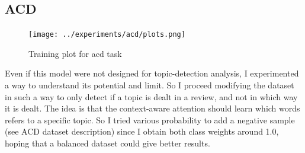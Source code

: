 \documentclass{article}
\begin{document}
        \subsection{ACD}\label{subsec:s2}
            \begin{figure}
                \texttt{[image: ../experiments/acd/plots.png]}
                \caption{Training plot for acd task}
                \label{fig:train-acd}
            \end{figure}
            Even if this model were not designed for topic-detection analysis, I experimented a way to understand its potential and limit.
            So I proceed modifying the dataset in such a way to only detect if a topic is dealt in a review, and not in which way it is dealt.
            The idea is that the context-aware attention should learn which words refers to a specific topic.
            So I tried various probability to add a negative sample (see ACD dataset description) since I obtain both class weights around 1.0, hoping that a balanced dataset could give better results.
\end{document}
